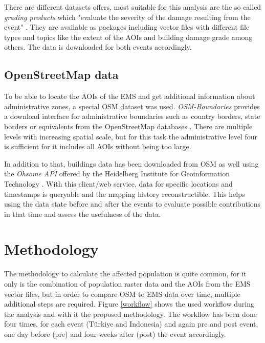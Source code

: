 \documentclass[oneside,twocolumn,10pt,cleanfoot,cleanhead]{asme2ej}
\begin{document}
There are different datasets offers, most suitable for this analysis are the so called \textit{grading products} which "evaluate the severity of the damage resulting from the event" \cite{Copernicus2023}.
They are available as packages including vector files with different file types and topics like the extent of the AOIs and building damage grade among others. 
The data is downloaded for both events accordingly.

\subsection{OpenStreetMap data}

To be able to locate the AOIs of the EMS and get additional information about administrative zones, a special OSM dataset was used.
\textit{OSM-Boundaries} provides a download interface for administrative boundaries such as country borders, state borders or equivalents from the OpenStreetMap databases \cite{OSMBoundaries2023}.
There are multiple levels with increasing spatial scale, but for this task the administrative level four is sufficient for it includes all AOIs without being too large.

In addition to that, buildings data has been downloaded from OSM as well using the \textit{Ohsome API} offered by the Heidelberg Institute for Geoinformation Technology \cite{Ohsome}.
With this client/web service, data for specific locations and timestamps is queryable and the mapping history reconstructible.
This helps using the data state before and after the events to evaluate possible contributions in that time and assess the usefulness of the data.


\section{Methodology}

The methodology to calculate the affected population is quite common, for it only is the combination of population raster data and the AOIs from the EMS vector files, but in order to compare OSM to EMS data over time, multiple additional steps are required.
Figure \ref{workflow} shows the used workflow during the analysis and with it the proposed methodology.
The workflow has been done four times, for each event (Türkiye and Indonesia) and again pre and post event, one day before (pre) and four weeks after (post) the event accordingly.
\end{document}
